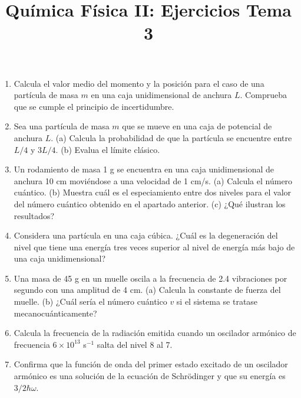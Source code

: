 \documentclass{tufte-handout}
\title[Química Física II: Ejercicios Tema 3]{
Química Física II: Ejercicios Tema 3}
\date{}  %
\begin{document}
\maketitle
\large

\begin{enumerate}
   \item Calcula el valor medio del momento y
   la posición para el caso de una partícula de
   masa $m$ en una caja unidimensional de anchura
   $L$. Comprueba que se cumple el principio de
   incertidumbre.
   
   \item Sea una partícula de masa $m$ que se
   mueve en una caja de potencial de anchura $L$.
   (a) Calcula la probabilidad de que la partícula
   se encuentre entre $L/4$ y $3L/4$. (b) Evalua el
   límite clásico.
   
  \item Un rodamiento de masa 1 g se encuentra
  en una caja unidimensional de anchura 10 cm
  moviéndose a una velocidad de 1 cm/s. (a) Calcula
  el número cuántico. (b) Muestra cuál es el especiamiento
  entre dos niveles para el valor del número cuántico 
  obtenido en el apartado anterior. (c) ¿Qué ilustran los 
  resultados?

  \item Considera una partícula en una caja cúbica. ¿Cuál es la degeneración del nivel que tiene una energía tres veces superior al nivel de energía más bajo de una caja unidimensional? 
  
  \item Una masa de 45 g en un muelle oscila a la 
  frecuencia de 2.4 vibraciones por segundo con 
  una amplitud de 4 cm. (a) Calcula la constante 
  de fuerza del muelle. (b) ¿Cuál sería el número
  cuántico $v$ si el sistema se tratase 
  mecanocuánticamente?
  
  \item Calcula la frecuencia de la radiación emitida
  cuando un oscilador armónico de frecuencia $6\times 10^{13}$
  s$^{-1}$ salta del nivel 8 al 7.

  \item Confirma que la función de onda del primer estado
  excitado de un oscilador armónico es una solución de la
  ecuación de Schrödinger y que su energía es $3/2\hbar\omega$.

\end{enumerate}

\newpage
\end{document}
